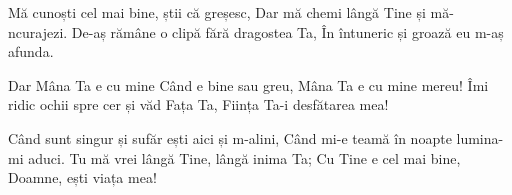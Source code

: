 \beginverse
Mă cunoști cel mai bine, știi că greșesc,
Dar mă chemi lângă Tine și mă-ncurajezi.
De-aș rămâne o clipă fără dragostea Ta,
În întuneric și groază eu m-aș afunda.
\endverse

\beginchorus
Dar Mâna Ta e cu mine
Când e bine sau greu,
Mâna Ta e cu mine mereu!
Îmi ridic ochii spre cer și văd Fața Ta,
Ființa Ta-i desfătarea mea!
\endchorus

\beginverse
Când sunt singur și sufăr ești aici și m-alini,
Când mi-e teamă în noapte lumina-mi aduci.
Tu mă vrei lângă Tine, lângă inima Ta;
Cu Tine e cel mai bine, Doamne, ești viața mea!
\endverse
\endsong